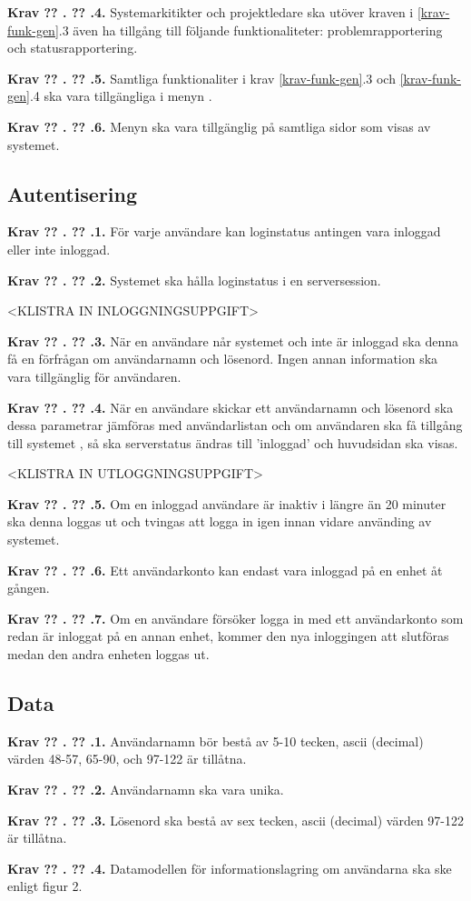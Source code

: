 \documentclass[a4paper]{article}
\newcommand\getcurrentref[1]{%
 \ifnumequal{\value{#1}}{0}
  {??}
  {\the\value{#1}}%
}
\newcommand\requirement[2]{
	\numberedrow{Krav}{#1}{#2}
}
\newcommand\numberedrow[3]{
	\noindent
	\textbf{#1 \getcurrentref{section}.\getcurrentref{subsection}.#2.} #3
	
}
\begin{document}
\requirement{4}{Systemarkitikter och projektledare ska utöver kraven i \ref{krav-funk-gen}.3 även ha tillgång till följande funktionaliteter: problemrapportering och statusrapportering.}
\requirement{5}{Samtliga funktionaliter i krav \ref{krav-funk-gen}.3 och \ref{krav-funk-gen}.4 ska vara tillgängliga i menyn .}
\requirement{6}{Menyn ska vara tillgänglig på samtliga sidor som visas av systemet. }
 
\subsection{Autentisering}
\requirement{1}{För varje användare kan loginstatus antingen vara inloggad eller inte inloggad.}
\requirement{2}{Systemet ska hålla loginstatus i en serversession.}
<KLISTRA IN INLOGGNINGSUPPGIFT>
\requirement{3}{När en användare når systemet och inte är inloggad ska denna få en förfrågan om användarnamn och lösenord. Ingen annan information ska vara tillgänglig för användaren.}
\requirement{4}{När en användare skickar ett användarnamn och lösenord ska dessa parametrar jämföras med användarlistan och om användaren ska få tillgång till systemet , så ska serverstatus ändras till 'inloggad' och huvudsidan ska visas.}
<KLISTRA IN UTLOGGNINGSUPPGIFT>
\requirement{5}{Om en inloggad användare är inaktiv i längre än 20 minuter ska denna loggas ut och tvingas att logga in igen innan vidare använding av systemet.}
\requirement{6}{Ett användarkonto kan endast vara inloggad på en enhet åt gången.}
\requirement{7}{Om en användare försöker logga in med ett användarkonto som redan är inloggat på en annan enhet, kommer den nya inloggingen att slutföras medan den andra enheten loggas ut.}

\subsection{Data}
\label{krav-funk-data}
\requirement{1}{Användarnamn bör bestå av 5-10 tecken, ascii (decimal) värden 48-57, 65-90, och 97-122 är tillåtna.}
\requirement{2}{Användarnamn ska vara unika.}
\requirement{3}{Lösenord ska bestå av sex tecken, ascii (decimal) värden 97-122 är tillåtna.}

\requirement{4}{Datamodellen för informationslagring om användarna ska ske enligt figur 2.
}
\end{document}
